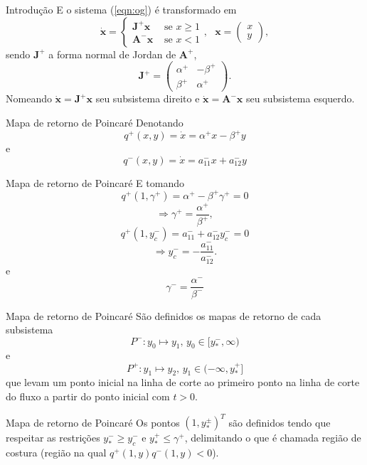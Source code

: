 \documentclass[aspectratio=169]{beamer}
\begin{document}
\begin{frame}{Introdução}
E o sistema (\ref{eqn:og}) é transformado em
    \begin{equation}
\label{eqn:jor}
\dot{\mathbf{x}}=\left\{\begin{array}{ll}
\mathbf{J}^{+} \mathbf{x} & \text { se } x \geq 1 \\
\mathbf{A}^{-} \mathbf{x} & \text { se } x<1
\end{array},\text{ }\mathbf{x}=\begin{pmatrix}
x\\
y
\end{pmatrix}\right.,
\end{equation}\pause
sendo $\mathbf{J}^{+}$ a forma normal de Jordan de $\mathbf{A}^{+}$,
\[
\mathbf{J}^{+}=\left(\begin{array}{cc}
\alpha^{+} & -\beta^{+} \\
\beta^{+} & \alpha^{+}
\end{array}\right).
\]\pause
Nomeando $\dot{\mathbf{x}}=\mathbf{J}^{+} \mathbf{x}$ seu subsistema direito e $\dot{\mathbf{x}}=\mathbf{A}^{-} \mathbf{x}$ seu subsistema esquerdo.
\end{frame}
\begin{frame}{Mapa de retorno de Poincaré}
    Denotando
\[
q^+(x, y)=\dot{x}=\alpha^+x − \beta^+y
\]
e
\[
q^-(x, y)=\dot{x}=a^−_{11}x + a^−_{12}y
\]
\end{frame}

\begin{frame}{Mapa de retorno de Poincaré}
E tomando
    \begin{equation}
\label{eqn:gmm}
q^+(1, \gamma^+)=\alpha^+ − \beta^+\gamma^+=0
\end{equation}
\[
\Rightarrow \gamma^+=\frac{\alpha^+}{\beta^+},
\]
\begin{equation}
\label{eqn:yc}
q^+(1, y_c^-)=a^−_{11} + a^−_{12} y_c^-=0
\end{equation}
\[
\Rightarrow y_c^-=-\frac{a^−_{11}}{a^−_{12}}.
\]
e
\[
\gamma^-=\frac{\alpha^-}{\beta^-}
\]
\end{frame}
\begin{frame}{Mapa de retorno de Poincaré}
São definidos os mapas de retorno de cada subsistema
    \begin{equation}
\label{left}
P^-:y_0\mapsto y_1\text{, }y_0\in[y_*^-, \infty)
\end{equation}
e
\begin{equation}
\label{right}
P^+:y_1\mapsto y_2\text{, }y_1\in(-\infty,y_*^+]
\end{equation}
que levam um ponto inicial na linha de corte ao primeiro ponto na linha de corte do fluxo a partir do ponto inicial com $t>0$.
\end{frame}
\begin{frame}{Mapa de retorno de Poincaré}
    Os pontos $(1,y_*^\pm)^T$ são definidos tendo que respeitar as restrições $y_*^-\geq y_c^-$ e $y_*^+\leq \gamma^+$, delimitando o que é chamada região de costura (região na qual $q^+(1,y)q^-(1,y)<0$).
\end{frame}
\end{document}
